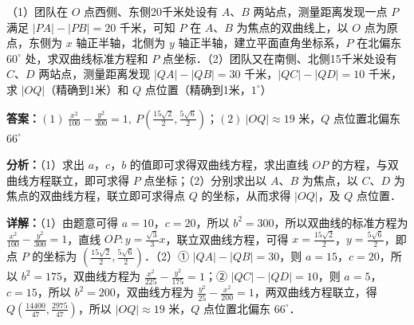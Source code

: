 \begin{question}[points=14]
（1）团队在 $O$ 点西侧、东侧20千米处设有 $A$、$B$ 两站点，测量距离发现一点 $P$ 满足 $|PA|-|PB|=20$ 千米，可知 $P$ 在 $A$、$B$ 为焦点的双曲线上，以 $O$ 点为原点，东侧为 $x$ 轴正半轴，北侧为 $y$ 轴正半轴，建立平面直角坐标系，$P$ 在北偏东 $60^\circ$ 处，求双曲线标准方程和 $P$ 点坐标．\newline（2）团队又在南侧、北侧15千米处设有 $C$、$D$ 两站点，测量距离发现 $|QA|-|QB|=30$ 千米，$|QC|-|QD|=10$ 千米，求 $|OQ|$（精确到1米）和 $Q$ 点位置（精确到1米，$1^\circ$）
\begin{solution}
\textbf{答案：}$(1)\ \frac{x^2}{100}-\frac{y^2}{300}=1,\ P(\frac{15\sqrt{2}}{2},\frac{5\sqrt{6}}{2})$；$(2)\ |OQ|\approx 19$ 米，$Q$ 点位置北偏东 $66^\circ$

\textbf{分析：}（1）求出 $a$，$c$，$b$ 的值即可求得双曲线方程，求出直线 $OP$ 的方程，与双曲线方程联立，即可求得 $P$ 点坐标；\newline（2）分别求出以 $A$、$B$ 为焦点，以 $C$、$D$ 为焦点的双曲线方程，联立即可求得点 $Q$ 的坐标，从而求得 $|OQ|$，及 $Q$ 点位置．

\textbf{详解：}（1）由题意可得 $a=10$，$c=20$，所以 $b^2=300$，所以双曲线的标准方程为 $\frac{x^2}{100}-\frac{y^2}{300}=1$，直线 $OP:y=\frac{\sqrt{3}}{3}x$，联立双曲线方程，可得 $x=\frac{15\sqrt{2}}{2}$，$y=\frac{5\sqrt{6}}{2}$，即点 $P$ 的坐标为 $(\frac{15\sqrt{2}}{2},\frac{5\sqrt{6}}{2})$．\newline（2）① $|QA|-|QB|=30$，则 $a=15$，$c=20$，所以 $b^2=175$，双曲线方程为 $\frac{x^2}{225}-\frac{y^2}{175}=1$；② $|QC|-|QD|=10$，则 $a=5$，$c=15$，所以 $b^2=200$，双曲线方程为 $\frac{y^2}{25}-\frac{x^2}{200}=1$，两双曲线方程联立，得 $Q(\frac{14400}{47},\frac{2975}{47})$，所以 $|OQ|\approx 19$ 米，$Q$ 点位置北偏东 $66^\circ$．
\end{solution}
\end{question}

